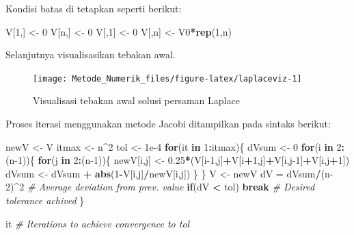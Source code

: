 \documentclass[]{book}
\newenvironment{Shaded}{\begin{snugshade}}{\end{snugshade}}
\newcommand{\CommentTok}[1]{\textcolor[rgb]{0.56,0.35,0.01}{\textit{#1}}}
\newcommand{\ControlFlowTok}[1]{\textcolor[rgb]{0.13,0.29,0.53}{\textbf{#1}}}
\newcommand{\DecValTok}[1]{\textcolor[rgb]{0.00,0.00,0.81}{#1}}
\newcommand{\FloatTok}[1]{\textcolor[rgb]{0.00,0.00,0.81}{#1}}
\newcommand{\KeywordTok}[1]{\textcolor[rgb]{0.13,0.29,0.53}{\textbf{#1}}}
\newcommand{\NormalTok}[1]{#1}
\newcommand{\OperatorTok}[1]{\textcolor[rgb]{0.81,0.36,0.00}{\textbf{#1}}}
\newcommand{\StringTok}[1]{\textcolor[rgb]{0.31,0.60,0.02}{#1}}
\theoremstyle{definition}
\theoremstyle{definition}
\theoremstyle{definition}
\theoremstyle{remark}
\begin{document}
Kondisi batas di tetapkan seperti berikut:

\begin{Shaded}
\begin{Highlighting}[]
\NormalTok{V[}\DecValTok{1}\NormalTok{,] <-}\StringTok{ }\DecValTok{0}
\NormalTok{V[n,] <-}\StringTok{ }\DecValTok{0}
\NormalTok{V[,}\DecValTok{1}\NormalTok{] <-}\StringTok{ }\DecValTok{0}
\NormalTok{V[,n] <-}\StringTok{ }\NormalTok{V0}\OperatorTok{*}\KeywordTok{rep}\NormalTok{(}\DecValTok{1}\NormalTok{,n)}
\end{Highlighting}
\end{Shaded}

Selanjutnya visualisasikan tebakan awal.

\begin{figure}

{\centering \texttt{[image: Metode\_Numerik\_files/figure-latex/laplaceviz-1]} 

}

\caption{Visualisasi tebakan awal solusi persaman Laplace}\label{fig:laplaceviz}
\end{figure}

Proses iterasi menggunakan metode Jacobi ditampilkan pada sintaks berikut:

\begin{Shaded}
\begin{Highlighting}[]
\NormalTok{newV  <-}\StringTok{ }\NormalTok{V}
\NormalTok{itmax <-}\StringTok{ }\NormalTok{n}\OperatorTok{^}\DecValTok{2}
\NormalTok{tol   <-}\StringTok{ }\FloatTok{1e-4}
\ControlFlowTok{for}\NormalTok{(it }\ControlFlowTok{in} \DecValTok{1}\OperatorTok{:}\NormalTok{itmax)\{}
\NormalTok{  dVsum <-}\StringTok{ }\DecValTok{0}
  \ControlFlowTok{for}\NormalTok{(i }\ControlFlowTok{in} \DecValTok{2}\OperatorTok{:}\NormalTok{(n}\DecValTok{-1}\NormalTok{))\{}
    \ControlFlowTok{for}\NormalTok{(j }\ControlFlowTok{in} \DecValTok{2}\OperatorTok{:}\NormalTok{(n}\DecValTok{-1}\NormalTok{))\{}
\NormalTok{      newV[i,j] <-}\StringTok{ }\FloatTok{0.25}\OperatorTok{*}\NormalTok{(V[i}\DecValTok{-1}\NormalTok{,j]}\OperatorTok{+}\NormalTok{V[i}\OperatorTok{+}\DecValTok{1}\NormalTok{,j]}\OperatorTok{+}\NormalTok{V[i,j}\DecValTok{-1}\NormalTok{]}\OperatorTok{+}\NormalTok{V[i,j}\OperatorTok{+}\DecValTok{1}\NormalTok{])}
\NormalTok{      dVsum <-}\StringTok{ }\NormalTok{dVsum }\OperatorTok{+}\StringTok{ }\KeywordTok{abs}\NormalTok{(}\DecValTok{1}\OperatorTok{-}\NormalTok{V[i,j]}\OperatorTok{/}\NormalTok{newV[i,j])}
\NormalTok{    \}}
\NormalTok{  \}}
\NormalTok{  V <-}\StringTok{ }\NormalTok{newV}
\NormalTok{  dV =}\StringTok{ }\NormalTok{dVsum}\OperatorTok{/}\NormalTok{(n}\DecValTok{-2}\NormalTok{)}\OperatorTok{^}\DecValTok{2} \CommentTok{# Average deviation from prev. value}
  \ControlFlowTok{if}\NormalTok{(dV }\OperatorTok{<}\StringTok{ }\NormalTok{tol) }\ControlFlowTok{break} \CommentTok{# Desired tolerance achived}
\NormalTok{\}}

\NormalTok{it }\CommentTok{# Iterations to achieve convergence to tol}
\end{Highlighting}
\end{Shaded}
\end{document}
